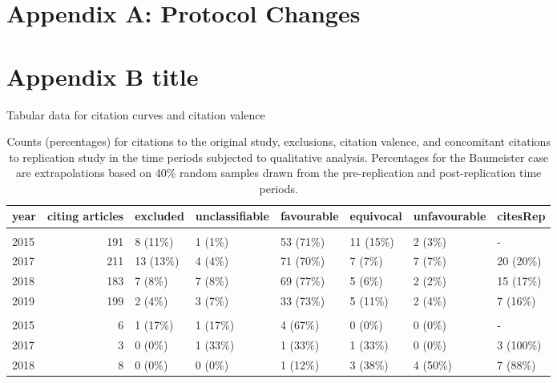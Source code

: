 \documentclass[
  american,
  ,man,floatsintext]{apa6}
\begin{document}
\begin{appendix}
\hypertarget{appA}{%
\section{Appendix A: Protocol Changes}\label{appA}}

\hypertarget{appB}{%
\section{Appendix B title}\label{appB}}

Tabular data for citation curves and citation valence

\begin{longtable}[t]{lrllllll}
\caption{\label{tab:tabularData}Counts (percentages) for citations to the original study, exclusions, citation valence, and concomitant citations to replication study in the time periods subjected to qualitative analysis. Percentages for the Baumeister case are extrapolations based on 40\% random samples drawn from the pre-replication and post-replication time periods.}\\
\toprule
year & citing
articles & excluded & unclassifiable & favourable & equivocal & unfavourable & citesRep\\
\midrule
\addlinespace[0.3em]
\multicolumn{8}{l}{\textbf{Baumeister}}\\
\hspace{1em}2015 & 191 & 8 (11\%) & 1 (1\%) & 53 (71\%) & 11 (15\%) & 2 (3\%) & -\\
\hspace{1em}2017 & 211 & 13 (13\%) & 4 (4\%) & 71 (70\%) & 7 (7\%) & 7 (7\%) & 20 (20\%)\\
\hspace{1em}2018 & 183 & 7 (8\%) & 7 (8\%) & 69 (77\%) & 5 (6\%) & 2 (2\%) & 15 (17\%)\\
\hspace{1em}2019 & 199 & 2 (4\%) & 3 (7\%) & 33 (73\%) & 5 (11\%) & 2 (4\%) & 7 (16\%)\\
\addlinespace[0.3em]
\multicolumn{8}{l}{\textbf{Sripada}}\\
\hspace{1em}2015 & 6 & 1 (17\%) & 1 (17\%) & 4 (67\%) & 0 (0\%) & 0 (0\%) & -\\
\hspace{1em}2017 & 3 & 0 (0\%) & 1 (33\%) & 1 (33\%) & 1 (33\%) & 0 (0\%) & 3 (100\%)\\
\hspace{1em}2018 & 8 & 0 (0\%) & 0 (0\%) & 1 (12\%) & 3 (38\%) & 4 (50\%) & 7 (88\%)\\

\end{longtable}
\end{appendix}
\end{document}
